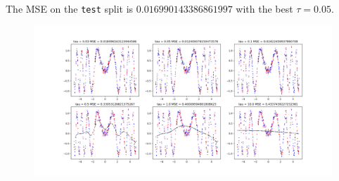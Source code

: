 \begin{answer}
	The MSE on the \texttt{test} split is $0.016990143386861997$ with the best $\tau = 0.05$.
	
	\begin{figure}[h]
		\centering
		\includegraphics[width=1\linewidth]{05-weighted/assets/plot-tau}
		\caption{}
		\label{fig:plot-tau}
	\end{figure}
	
\end{answer}